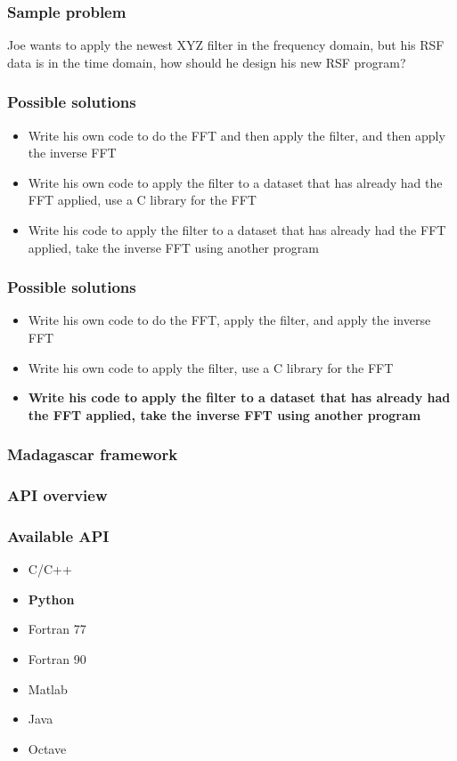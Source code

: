 \begin{frame} \frametitle{Sample problem}
\begin{center} Joe wants to apply the newest XYZ filter in the frequency domain, but his RSF data is in the time domain, how should he design his new RSF program? \end{center}
\end{frame}

\begin{frame} \frametitle{Possible solutions}
\begin{itemize}
\item Write his own code to do the FFT and then apply the filter, and then apply the inverse FFT
\item Write his own code to apply the filter to a dataset that has already had the FFT applied, use a C library for the FFT
\item Write his code to apply the filter to a dataset that has already had the FFT applied, take the inverse FFT using another program
\end{itemize}
\end{frame}

\begin{frame} \frametitle{Possible solutions}
\begin{itemize}
\item Write his own code to do the FFT, apply the filter, and apply the inverse FFT
\item Write his own code to apply the filter, use a C library for the FFT
\item \textbf{Write his code to apply the filter to a dataset that has already had the FFT applied, take the inverse FFT using another program}
\end{itemize}
\end{frame}

\begin{frame}
\end{frame}

\begin{frame} \frametitle{Madagascar framework}
\end{frame}

\begin{frame} \frametitle{API overview}
\end{frame}

\begin{frame} \frametitle{Available API}
\begin{itemize}
\item C/C++
\item \textbf{Python}
\item Fortran 77
\item Fortran 90
\item Matlab
\item Java
\item Octave
\end{itemize}
\end{frame}

